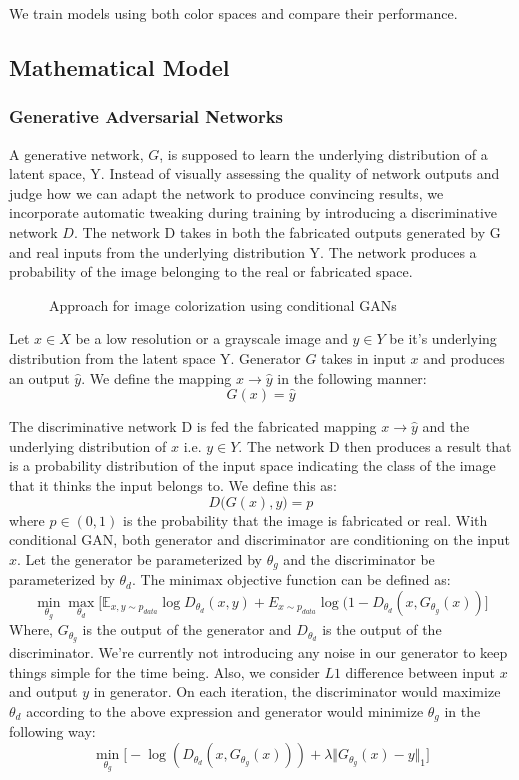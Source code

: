 \documentclass[conference]{IEEEtran}
\begin{document}
We train models using both color spaces and compare their performance.
\subsection{Mathematical Model}
\subsubsection{Generative Adversarial Networks}
 A generative network, $G$, is supposed to learn the underlying distribution of a latent space, Y. Instead of visually assessing the quality of network outputs and judge how we can adapt the network to produce convincing results, we incorporate automatic tweaking during training by introducing a discriminative network $D$. The network D takes in both the fabricated outputs generated by G and real inputs from the underlying distribution Y. The network produces a probability of the image belonging to the real or fabricated space.
\begin{figure}[!htb]
    \centering
    
    \caption{Approach for image colorization using conditional GANs}
    \label{fig:gan_visualization}
\end{figure}
  Let $x \in X$ be a low resolution or a grayscale image and $y \in Y$ be it's underlying distribution from the latent space Y. Generator $G$ takes in input $x$ and produces an output $\hat{y}$. We define the mapping $x \rightarrow \hat{y}$ in the following manner:
  $$G(x) = \hat{y}$$

 The discriminative network D is fed the fabricated mapping $x \rightarrow \hat{y}$ and the underlying distribution of $x$ i.e. $y \in Y$. The network D then produces a result that is a probability distribution of the input space indicating the class of the image that it thinks the input belongs to. We define this as:
 $$D\big(G(x),y\big) = p$$
 where $p \in (0,1)$ is the probability that the image is fabricated or real.
With conditional GAN, both generator and discriminator are conditioning on the input $x$. Let the generator be parameterized by $\theta_g$ and the discriminator be parameterized by $\theta_d$. The minimax objective function can be defined as:
	\begingroup\makeatletter\def\f@size{7}\check@mathfonts \[
		\min_{\theta_g}\max_{\theta_d}\Big[\mathbb{E}_{x,y\sim p_{data}} \log D_{\theta_d}(x,y) + E_{x\sim p_{data}} \log(1 - D_{\theta_d}(x, G_{\theta_g}(x))\Big]
	\] \endgroup
    \normalsize
Where, $G_{\theta_{g}}$ is the output of the generator and $D_{\theta_d}$ is the output of the discriminator.
We're currently not introducing any noise in our generator to keep things simple for the time being. Also, we consider $L1$ difference between input $x$ and output $y$ in generator. On each iteration, the discriminator would maximize $\theta_d$ according to the above expression and generator would minimize $\theta_g$ in the following way:
	\[
		\min_{\theta_g}\Big[-\log(D_{\theta_d}(x,G_{\theta_g}(x)))+\lambda \Vert G_{\theta_g}(x) - y \Vert_1 \Big]
	\]
\end{document}
